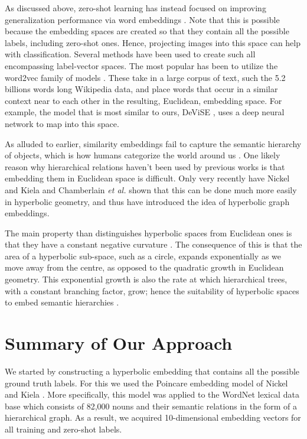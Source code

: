 \documentclass[12pt]{report}
\begin{document}
As discussed above, zero-shot learning has instead focused on improving generalization performance via word embeddings \cite{Palatucci2009, Socher, Huang2012, Frome2013, Norouzi2013}. Note that this is possible because the embedding spaces are created so that they contain all the possible labels, including zero-shot ones. Hence, projecting images into this space can help with classification. Several methods have been used to create such all encompassing label-vector spaces. The most popular has been to utilize the word2vec family of models \cite{Mikolov, Mikolov2013}. These take in a large corpus of text, such the 5.2 billions words long Wikipedia data, and place words that occur in a similar context near to each other in the resulting, Euclidean, embedding space. For example, the model that is most similar to ours, DeViSE \cite{Frome2013}, uses a deep neural network to map into this space. 

As alluded to earlier, similarity embeddings fail to capture the semantic hierarchy of objects, which is how humans categorize the world around us \cite{Rosch1976, Joliceur1984}. One likely reason why hierarchical relations haven't been used by previous works is that embedding them in Euclidean space is difficult. Only very recently have Nickel and Kiela \cite{Nickel2017} and Chamberlain \textit{et al.} \cite{Chamberlain2017} shown that this can be done much more easily in hyperbolic geometry, and thus have introduced the idea of hyperbolic graph embeddings.

The main property than distinguishes hyperbolic spaces from Euclidean ones is that they have a constant negative curvature \cite{Greenberg1994}. The consequence of this is that the area of a hyperbolic sub-space, such as a circle, expands exponentially as we move away from the centre, as opposed to the quadratic growth in Euclidean geometry. This exponential growth is also the rate at which hierarchical trees, with a constant branching factor, grow; hence the suitability of hyperbolic spaces to embed semantic hierarchies \cite{Nickel2017, Chamberlain2017}.

\section{Summary of Our Approach}
We started by constructing a hyperbolic embedding that contains all the possible ground truth labels. For this we used the Poincare embedding model of Nickel and Kiela \cite{Nickel2017}. More specifically, this model was applied to the WordNet lexical data base which consists of 82,000 nouns and their semantic relations in the form of a hierarchical graph. As a result, we acquired 10-dimensional embedding vectors for all training and zero-shot labels.
\end{document}
